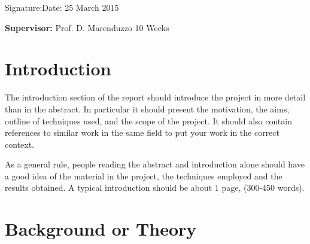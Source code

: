 \documentclass[a4paper,12pt]{article}
\begin{document}
\vspace*{2cm}
Signature:\hspace*{8cm}Date: 25 March 2015

\vfill
{\bf Supervisor:} Prof. D. Marenduzzo                 %
\hfill
10 Weeks                                         %
\newpage
%
\pagestyle{plain}                               %
\setcounter{page}{1}                            %
\tableofcontents                                %

\break
\section{Introduction}

The introduction section of the report should introduce the project in
more detail than in the abstract. In particular it should present the
motivation, the aims, outline of techniques used, and the scope of the project. 
It should also contain references to similar work in the
same field to put your work in the correct context.

As a general rule, people reading the abstract and introduction alone
should have a good idea of the material in the project, the techniques
employed and the results obtained. A typical introduction should be
about 1 page, (300-450 words). 
\section{Background or Theory}

%
%
\end{document}
